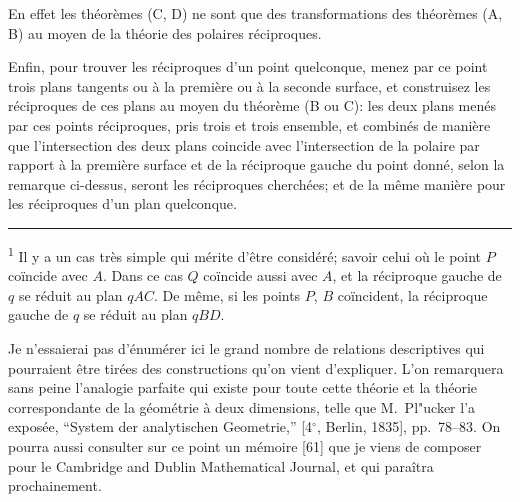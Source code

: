 \documentclass[11pt,a4paper]{book}
\begin{document}
En effet les th\'{e}or\`{e}mes (C, D) ne sont que des transformations des th\'{e}or\`{e}mes (A, B) au moyen de la th\'{e}orie des polaires r\'{e}ciproques.

Enfin, pour trouver les r\'{e}ciproques d'un point quelconque, menez par ce point trois plans tangents ou \`{a} la premi\`{e}re ou \`{a} la seconde surface, et construisez les r\'{e}ciproques de ces plans au moyen du th\'{e}or\`{e}me (B ou C): les deux plans men\'{e}s par ces points r\'{e}ciproques, pris trois et trois ensemble, et combin\'{e}s de mani\`{e}re que l'intersection des deux plans coincide avec l'intersection de la polaire par rapport \`{a} la premi\`{e}re surface et de la r\'{e}ciproque gauche du point donn\'{e}, selon la remarque ci-dessus, seront les r\'{e}ciproques cherch\'{e}es; et de la m\^{e}me mani\`{e}re pour les r\'{e}ciproques d'un plan quelconque.

\vspace{0.5em}
\noindent\rule{0.3\textwidth}{0.4pt}

\small
\textsuperscript{1} Il y a un cas tr\`{e}s simple qui m\'{e}rite d'\^{e}tre consid\'{e}r\'{e}; savoir celui o\`{u} le point $P$ co\"{i}ncide avec $A$. Dans ce cas $Q$ co\"{i}ncide aussi avec $A$, et la r\'{e}ciproque gauche de $q$ se r\'{e}duit au plan $qAC$. De m\^{e}me, si les points $P$, $B$ co\"{i}ncident, la r\'{e}ciproque gauche de $q$ se r\'{e}duit au plan $qBD$.
\normalsize

\newpage

\setcounter{page}{418}

Je n'essaierai pas d'\'{e}num\'{e}rer ici le grand nombre de relations descriptives qui pourraient \^{e}tre tir\'{e}es des constructions qu'on vient d'expliquer. L'on remarquera sans peine l'analogie parfaite qui existe pour toute cette th\'{e}orie et la th\'{e}orie correspondante de la g\'{e}om\'{e}trie \`{a} deux dimensions, telle que M.~Pl"{u}cker l'a expos\'{e}e, ``System der analytischen Geometrie,'' [4$^{\circ}$, Berlin, 1835], pp.~78--83. On pourra aussi consulter sur ce point un m\'{e}moire [61] que je viens de composer pour le Cambridge and Dublin Mathematical Journal, et qui para\^{i}tra prochainement.
\end{document}
